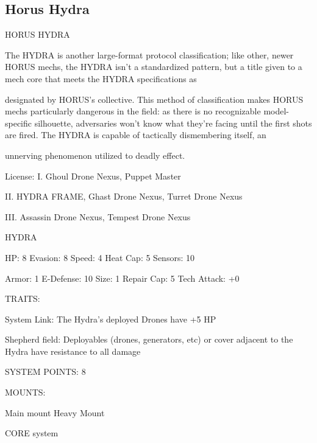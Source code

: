                                                                                                                      \subsection{Horus Hydra}


                                           HORUS HYDRA  

The HYDRA is another large-format protocol classification; like other, newer HORUS mechs, the HYDRA  
isn’t a standardized pattern, but a title given to a mech core that meets the HYDRA specifications as  

designated by HORUS’s collective. This method of classification makes HORUS mechs particularly  
dangerous in the field: as there is no recognizable model-specific silhouette, adversaries won’t know what  
they’re facing until the first shots are fired. The HYDRA is capable of tactically dismembering itself, an  

unnerving phenomenon utilized to deadly effect.  

                                                  License:  
I. Ghoul Drone Nexus, Puppet Master
 
II. HYDRA FRAME, Ghast Drone Nexus, Turret Drone Nexus
 
III. Assassin Drone Nexus, Tempest Drone Nexus
 

                                                  HYDRA 

 HP: 8          Evasion: 8                            Speed:  4          Heat Cap: 5       Sensors: 10 

 Armor: 1       E-Defense: 10                         Size: 1            Repair Cap: 5     Tech Attack:  
                                                                                           +0 

                                                  TRAITS: 

 System Link: The Hydra’s deployed Drones have +5 HP
 
 Shepherd field: Deployables (drones, generators, etc) or cover adjacent to the Hydra have resistance  
 to all damage 

                                            SYSTEM POINTS: 8 

                                                 MOUNTS: 

 Main mount                        Heavy Mount 

                                               CORE system 

